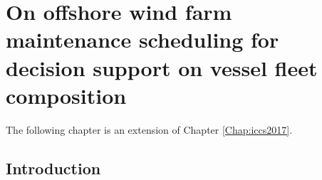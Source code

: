 
\chapter{On offshore wind farm maintenance scheduling for decision support on vessel fleet composition }
\label{Chap:ejor}
\ifpdf
\graphicspath{{X/figures/PNG/}{X/figures/PDF/}{X/figures/}}
\else
\graphicspath{{X/figures/EPS/}{X/figures/}}
\fi

The following chapter is an extension of Chapter \ref{Chap:iccs2017}.




\section{Introduction}


